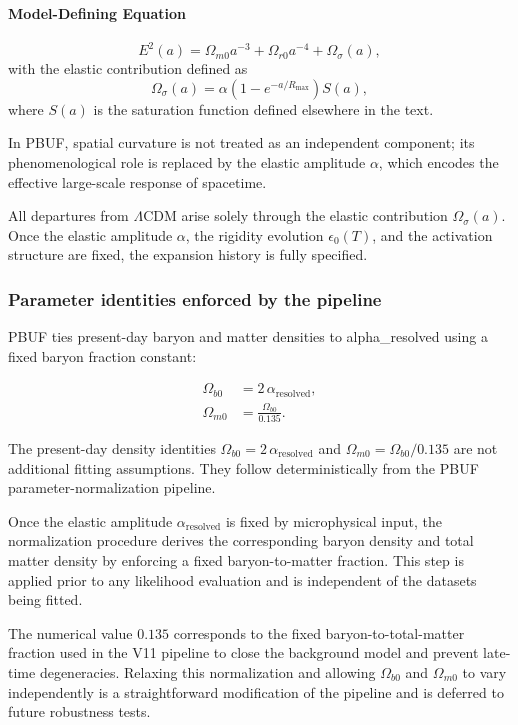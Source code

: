 \documentclass[11pt]{article}
\begin{document}
\paragraph{Model-Defining Equation}
\begin{equation}
E^2(a) =
\Omega_{m0} a^{-3}
+ \Omega_{r0} a^{-4}
+ \Omega_\sigma(a),
\end{equation}
with the elastic contribution defined as
\begin{equation}
\Omega_\sigma(a) =
\alpha \left(1 - e^{-a/R_{\max}}\right) S(a),
\end{equation}
where \(S(a)\) is the saturation function defined elsewhere in the text.

In PBUF, spatial curvature is not treated as an independent component; its phenomenological role is replaced by the elastic amplitude \(\alpha\), which encodes the effective large-scale response of spacetime.

All departures from \(\Lambda\)CDM arise solely through the elastic contribution \(\Omega_\sigma(a)\).
Once the elastic amplitude \(\alpha\), the rigidity evolution \(\epsilon_0(T)\), and the activation structure are fixed, the expansion history is fully specified.

\subsubsection{Parameter identities enforced by the pipeline}
PBUF ties present-day baryon and matter densities to alpha\_resolved using a fixed baryon fraction constant:

\begin{align}
\Omega_{b0} &= 2\,\alpha_{\mathrm{resolved}},\\
\Omega_{m0} &= \frac{\Omega_{b0}}{0.135}.
\end{align}

The present-day density identities \(\Omega_{b0} = 2\,\alpha_{\mathrm{resolved}}\) and \(\Omega_{m0} = \Omega_{b0} / 0.135\) are not additional fitting assumptions.
They follow deterministically from the PBUF parameter-normalization pipeline.

Once the elastic amplitude \(\alpha_{\mathrm{resolved}}\) is fixed by microphysical input, the normalization procedure derives the corresponding baryon density and total matter density by enforcing a fixed baryon-to-matter fraction.
This step is applied prior to any likelihood evaluation and is independent of the datasets being fitted.

The numerical value \(0.135\) corresponds to the fixed baryon-to-total-matter fraction used in the V11 pipeline to close the background model and prevent late-time degeneracies.
Relaxing this normalization and allowing \(\Omega_{b0}\) and \(\Omega_{m0}\) to vary independently is a straightforward modification of the pipeline and is deferred to future robustness tests.
\end{document}
